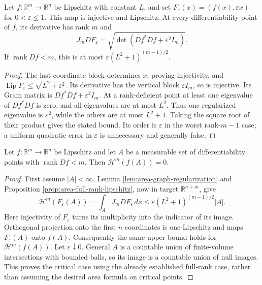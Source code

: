 \begin{lemma}\label{lem:area-graph-regularization}
Let $f:\mathbb R^m\to\mathbb R^n$ be Lipschitz with constant $L$, and set $F_\varepsilon(x)=(f(x),\varepsilon x)$ for $0<\varepsilon\leq1$. This map is injective and Lipschitz. At every differentiability point of $f$, its derivative has rank $m$ and
\[
 J_mDF_\varepsilon
 =\sqrt{\det(Df^*Df+\varepsilon^2I_m)}.
\]
If $\operatorname{rank}Df<m$, this is at most $\varepsilon(L^2+1)^{(m-1)/2}$.
\end{lemma}
\begin{proof}
The last coordinate block determines $x$, proving injectivity, and $\operatorname{Lip}F_\varepsilon\leq\sqrt{L^2+\varepsilon^2}$. Its derivative has the vertical block $\varepsilon I_m$, so is injective. Its Gram matrix is $Df^*Df+\varepsilon^2I_m$. At a rank-deficient point at least one eigenvalue of $Df^*Df$ is zero, and all eigenvalues are at most $L^2$. Thus one regularized eigenvalue is $\varepsilon^2$, while the others are at most $L^2+1$. Taking the square root of their product gives the stated bound. Its order is $\varepsilon$ in the worst rank-$m-1$ case; a uniform quadratic error in $\varepsilon$ is unnecessary and generally false.
\end{proof}

\begin{proposition}\label{prop:area-critical-image-null}
Let $f:\mathbb R^m\to\mathbb R^n$ be Lipschitz and let $A$ be a measurable set of differentiability points with $\operatorname{rank}Df<m$. Then $\mathcal H^m(f(A))=0$.
\end{proposition}
\begin{proof}
First assume $|A|<\infty$. Lemma \ref{lem:area-graph-regularization} and Proposition \ref{prop:area-full-rank-lipschitz}, now in target $\mathbb R^{n+m}$, give
\[
 \mathcal H^m(F_\varepsilon(A))
 =\int_AJ_mDF_\varepsilon\,dx
 \leq\varepsilon(L^2+1)^{(m-1)/2}|A|.
\]
Here injectivity of $F_\varepsilon$ turns its multiplicity into the indicator of its image. Orthogonal projection onto the first $n$ coordinates is one-Lipschitz and maps $F_\varepsilon(A)$ onto $f(A)$. Consequently the same upper bound holds for $\mathcal H^m(f(A))$. Let $\varepsilon\downarrow0$. General $A$ is a countable union of finite-volume intersections with bounded balls, so its image is a countable union of null images. This proves the critical case using the already established full-rank case, rather than assuming the desired area formula on critical points.
\end{proof}


